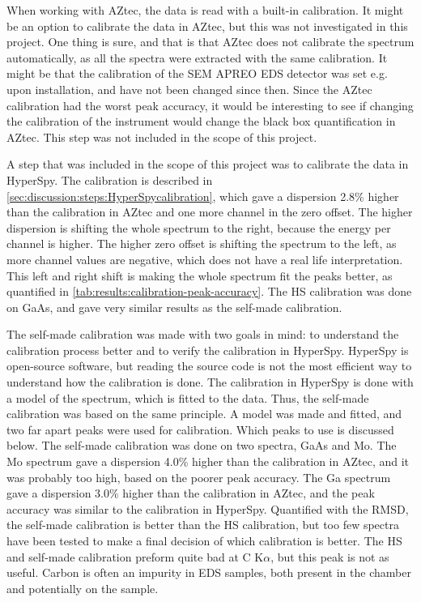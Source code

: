 When working with AZtec, the data is read with a built-in calibration.
It might be an option to calibrate the data in AZtec, but this was not investigated in this project.
One thing is sure, and that is that AZtec does not calibrate the spectrum automatically, as all the spectra were extracted with the same calibration.
It might be that the calibration of the SEM APREO EDS detector was set e.g. upon installation, and have not been changed since then.
Since the AZtec calibration had the worst peak accuracy, it would be interesting to see if changing the calibration of the instrument would change the black box quantification in AZtec.
This step was not included in the scope of this project.


A step that was included in the scope of this project was to calibrate the data in HyperSpy.
The calibration is described in \cref{sec:discussion:steps:HyperSpycalibration}, which gave a dispersion 2.8\% higher than the calibration in AZtec and one more channel in the zero offset.
The higher dispersion is shifting the whole spectrum to the right, because the energy per channel is higher.
The higher zero offset is shifting the spectrum to the left, as more channel values are negative, which does not have a real life interpretation.
This left and right shift is making the whole spectrum fit the peaks better, as quantified in \cref{tab:results:calibration-peak-accuracy}.
The HS calibration was done on GaAs, and gave very similar results as the self-made calibration.


The self-made calibration was made with two goals in mind: to understand the calibration process better and to verify the calibration in HyperSpy.
HyperSpy is open-source software, but reading the source code is not the most efficient way to understand how the calibration is done.
The calibration in HyperSpy is done with a model of the spectrum, which is fitted to the data.
Thus, the self-made calibration was based on the same principle.
A model was made and fitted, and two far apart peaks were used for calibration.
Which peaks to use is discussed below.
The self-made calibration was done on two spectra, GaAs and Mo.
The Mo spectrum gave a dispersion 4.0\% higher than the calibration in AZtec, and it was probably too high, based on the poorer peak accuracy.
The Ga spectrum gave a dispersion 3.0\% higher than the calibration in AZtec, and the peak accuracy was similar to the calibration in HyperSpy.
Quantified with the RMSD, the self-made calibration is better than the HS calibration, but too few spectra have been tested to make a final decision of which calibration is better.
The HS and self-made calibration preform quite bad at C K$\alpha$, but this peak is not as useful.
Carbon is often an impurity in EDS samples, both present in the chamber and potentially on the sample.


